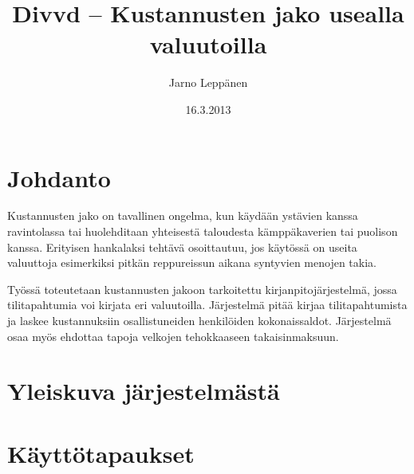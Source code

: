 \documentclass[a4paper,parskip=half]{scrartcl}
\author{Jarno Leppänen}
\title{Divvd -- Kustannusten jako usealla valuutoilla}
\date{16.3.2013}
\begin{document}
\maketitle

\section{Johdanto}

Kustannusten jako on tavallinen ongelma, kun käydään ystävien kanssa
ravintolassa tai huolehditaan yhteisestä taloudesta kämppäkaverien tai
puolison kanssa. Erityisen hankalaksi tehtävä osoittautuu, jos käytössä on
useita valuuttoja esimerkiksi pitkän reppureissun aikana syntyvien menojen
takia.

Työssä toteutetaan kustannusten jakoon tarkoitettu kirjanpitojärjestelmä,
jossa tilitapahtumia voi kirjata eri valuutoilla. Järjestelmä pitää kirjaa
tilitapahtumista ja laskee kustannuksiin osallistuneiden henkilöiden
kokonaissaldot. Järjestelmä osaa myös ehdottaa tapoja velkojen tehokkaaseen
takaisinmaksuun.

\section{Yleiskuva järjestelmästä}

\cite{verhoeff2004settling}
\section{Käyttötapaukset}



\end{document}
